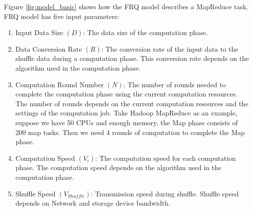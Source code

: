 {Figure \ref{fig:model_basic} shows how the FRQ model describes a MapReduce task. FRQ model has five input parameters:
\begin{enumerate}
	\item Input Data Size \((D)\): The data size of the computation phase.
	\item Data Conversion Rate \((R)\): The conversion rate of the input data to the shuffle data during a computation phase. This conversion rate depends on the algorithm used in the computation phase.
    \item Computation Round Number \((N)\): The number of rounds needed to complete the computation phase using the current computation resources. The number of rounds depends on the current computation resources and the settings of the computation job. Take Hadoop MapReduce as an example, suppose we have 50 CPUs and enough memory, the Map phase consists of 200 map tasks. Then we need 4 rounds of computation to complete the Map phase.
    \item Computation Speed \((V_{i})\): 
    The computation speed for each computation phase. The computation speed depends on the algorithm used in the computation phase.
    \item Shuffle Speed \((V_{Shuffle})\): 
    Transmission speed during shuffle. Shuffle speed depends on Network and storage device bandwidth.
\end{enumerate}

}
